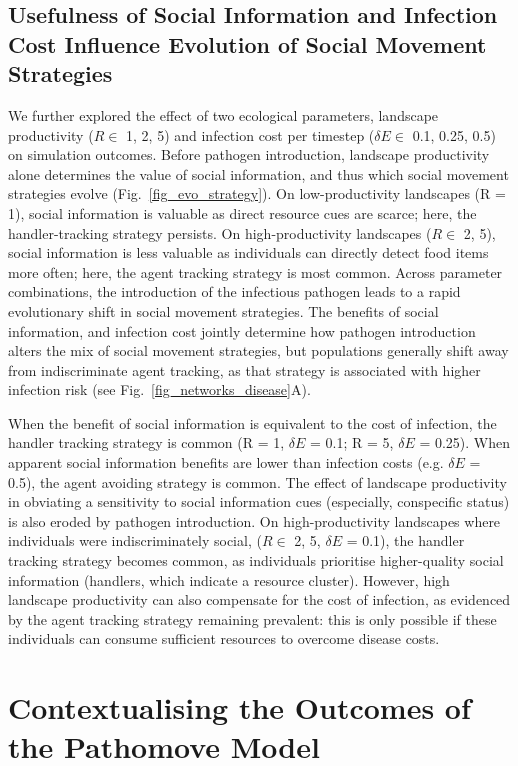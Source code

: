 \subsection*{Usefulness of Social Information and Infection Cost Influence Evolution of Social Movement Strategies}

We further explored the effect of two ecological parameters, landscape productivity ($R \in $ 1, 2, 5) and infection cost per timestep ($\delta E \in$ 0.1, 0.25, 0.5) on simulation outcomes.
Before pathogen introduction, landscape productivity alone determines the value of social information, and thus which social movement strategies evolve (Fig.~\ref{fig_evo_strategy}).
On low-productivity landscapes (R = 1), social information is valuable as direct resource cues are scarce; here, the handler-tracking strategy persists.
On high-productivity landscapes ($R \in$ 2, 5), social information is less valuable as individuals can directly detect food items more often; here, the agent tracking strategy is most common.
Across parameter combinations, the introduction of the infectious pathogen leads to a rapid evolutionary shift in social movement strategies.
The benefits of social information, and infection cost jointly determine how pathogen introduction alters the mix of social movement strategies, but populations generally shift away from indiscriminate agent tracking, as that strategy is associated with higher infection risk (see Fig.~\ref{fig_networks_disease}A).

When the benefit of social information is equivalent to the cost of infection, the handler tracking strategy is common (R = 1, $\delta E$ = 0.1; R = 5, $\delta E$ = 0.25).
When apparent social information benefits are lower than infection costs (e.g. $\delta E$ = 0.5), the agent avoiding strategy is common.
The effect of landscape productivity in obviating a sensitivity to social information cues (especially, conspecific status) is also eroded by pathogen introduction.
On high-productivity landscapes where individuals were indiscriminately social, ($R \in$ 2, 5, $\delta E$ = 0.1), the handler tracking strategy becomes common, as individuals prioritise higher-quality social information (handlers, which indicate a resource cluster).
However, high landscape productivity can also compensate for the cost of infection, as evidenced by the agent tracking strategy remaining prevalent: this is only possible if these individuals can consume sufficient resources to overcome disease costs.

\section*{Contextualising the Outcomes of the Pathomove Model}

